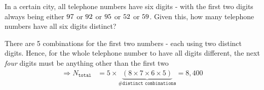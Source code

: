 

\question[2] In a certain city, all telephone numbers have six digits - with the first two digits
always being either $97$ or $92$ or $95$ or $52$ or 
$59$. Given this, how many telephone numbers have all six digits distinct?


\watchout[-20pt]

\ifprintanswers
\fi 

\begin{solution}[\mcq]
	There are 5 combinations for the first two numbers - each using two distinct digits. Hence, 
	for the whole telephone number to have all digits different, the next \textit{four} digits 
	must be anything other than the first two
	\begin{align}
		\Rightarrow N_{\texttt{total}} &= 5 \times \underbrace{(8 \times 7 \times 6 \times 5 )}_{\texttt{\# distinct combinations}}
		 = 8,400
	\end{align}
\end{solution}

